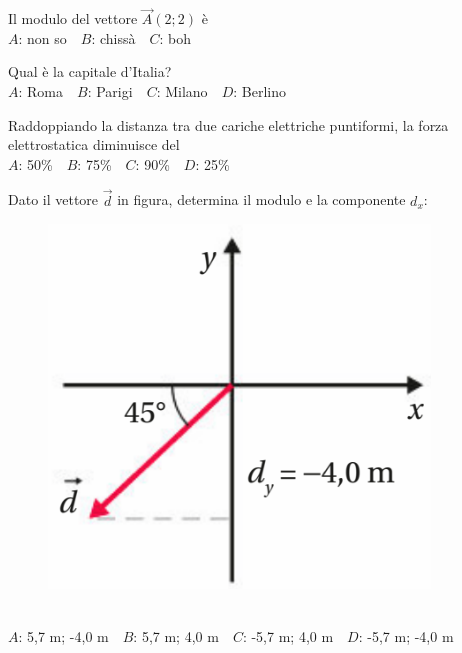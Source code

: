 \mcquestionfooter



\def\mcquestionnumber{5}


\mcquestionheader Il modulo del vettore $\vec{A}(2;2)$ è\\
{$A$}: non so\ \ {$B$}: chissà\ \ {$C$}: boh\ \ 

\mcquestionfooter



\def\mcquestionnumber{6}


\mcquestionheader Qual è la capitale d’Italia?\\
{$A$}: Roma\ \ {$B$}: Parigi\ \ {$C$}: Milano\ \ {$D$}: Berlino\ \ 

\mcquestionfooter



\def\mcquestionnumber{7}


\mcquestionheader Raddoppiando la distanza tra due cariche elettriche puntiformi, la forza elettrostatica diminuisce del\\
{$A$}: 50\%\ \ {$B$}: 75\%\ \ {$C$}: 90\%\ \ {$D$}: 25\%\ \ 

\mcquestionfooter



\def\mcquestionnumber{8}


\mcquestionheader Dato il vettore $\vec{d}$ in figura, determina il modulo e la componente $d_x$: \begin{figure}[h!]   \begin{center}     \includegraphics[scale=0.35]{vettored.png}   \end{center} \end{figure}\\
{$A$}: 5,7 m; -4,0 m\ \ {$B$}: 5,7 m; 4,0 m\ \ {$C$}: -5,7 m; 4,0 m\ \ {$D$}: -5,7 m; -4,0 m\ \ 


